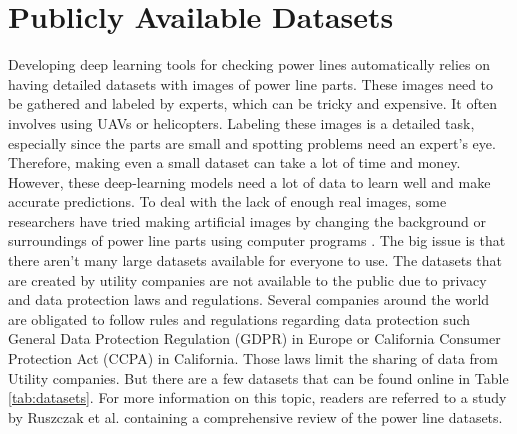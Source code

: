 \section{Publicly Available Datasets}\label{sec:datasets}
Developing deep learning tools for checking power lines automatically relies on having detailed datasets with images of power line parts. These images need to be gathered and labeled by experts, which can be tricky and expensive. It often involves using UAVs or helicopters. Labeling these images is a detailed task, especially since the parts are small and spotting problems need an expert's eye. Therefore, making even a small dataset can take a lot of time and money. However, these deep-learning models need a lot of data to learn well and make accurate predictions. To deal with the lack of enough real images, some researchers have tried making artificial images by changing the background or surroundings of power line parts using computer programs \cite{tao2018detection}. The big issue is that there aren't many large datasets available for everyone to use. The datasets that are created by utility companies are not available to the public due to privacy and data protection laws and regulations. Several companies around the world are obligated to follow rules and regulations regarding data protection such
General Data Protection Regulation (GDPR) \cite{voigt2017eu}
in Europe or California Consumer Protection Act (CCPA) \cite{ccpa} in California. Those laws limit the sharing of data from Utility companies. But there are a few datasets that can be found online in Table \ref{tab:datasets}. For more information on this topic, readers are referred to a study by Ruszczak et al. \cite{ruszczak2023overview} containing a comprehensive review of the power line datasets.

